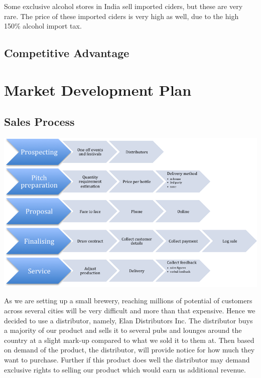 \documentclass[11pt]{article}
\begin{document}
Some exclusive alcohol stores in India sell imported ciders, but these are very rare. The price of these imported ciders is very high as well, due to the high 150\% alcohol import tax.

  \subsection{Competitive Advantage}

\newpage
\section{Market Development Plan}
  \subsection{Sales Process}
  \includegraphics[width=\textwidth,keepaspectratio]{./process.png}

As we are setting up a small brewery, reaching millions of potential of customers across several cities will be very difficult and more than that expensive. Hence we decided to use a distributor, namely, Elan Distributors Inc. The distributor buys a majority of our product and sells it to several pubs and lounges around the country at a slight mark-up compared to what we sold it to them at. Then based on demand of the product, the distributor, will provide notice for how much they want to purchase. Further if this product does well the distributor may demand exclusive rights to selling our product which would earn us additional revenue.
\end{document}
